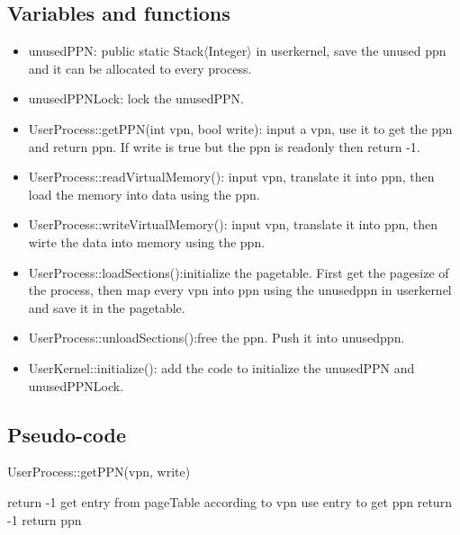 \documentclass[a4paper,10pt]{article}
\begin{document}
\subsection{Variables and functions}

\begin{itemize}
\item unusedPPN: public static Stack$\langle$Integer$\rangle$ in userkernel, save the unused ppn and it can be allocated to every process.

\item unusedPPNLock: lock the unusedPPN.

\item UserProcess::getPPN(int vpn, bool write): input a vpn, use it to get the ppn and return ppn. If write is true but the ppn is readonly then return -1.

\item UserProcess::readVirtualMemory(): input vpn, translate it into ppn, then load the memory into data using the ppn.

\item UserProcess::writeVirtualMemory(): input vpn, translate it into ppn, then wirte the data into memory using the ppn.

\item UserProcess::loadSections():initialize the pagetable. First get the pagesize of the process, then map every vpn into ppn using the unusedppn in userkernel and save it in the pagetable.

\item UserProcess::unloadSections():free the ppn. Push it into unusedppn.

\item UserKernel::initialize(): add the code to initialize the unusedPPN and unusedPPNLock.
\end{itemize}
\subsection{Pseudo-code}

\begin{algorithm}
\caption{UserProcess::getPPN(vpn, write)}
      {
           return -1\;
      }
get entry from pageTable according to vpn\;
use entry to get ppn\;
      {
           return -1\;
      }
return ppn\;
\end{algorithm}
\end{document}
